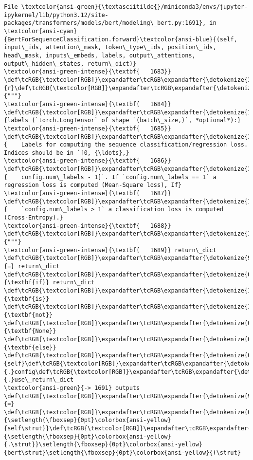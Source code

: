 \documentclass[11pt]{article}
\begin{document}
\begin{Verbatim}[commandchars=\\\{\}, frame=single, framerule=2mm, rulecolor=\color{outerrorbackground}]
File \textcolor{ansi-green}{\textasciitilde{}/miniconda3/envs/jupyter-ipykernel/lib/python3.12/site-packages/transformers/models/bert/modeling\_bert.py:1691}, in \textcolor{ansi-cyan}{BertForSequenceClassification.forward}\textcolor{ansi-blue}{(self, input\_ids, attention\_mask, token\_type\_ids, position\_ids, head\_mask, inputs\_embeds, labels, output\_attentions, output\_hidden\_states, return\_dict)}
\textcolor{ansi-green-intense}{\textbf{   1683}} \def\tcRGB{\textcolor[RGB]}\expandafter\tcRGB\expandafter{\detokenize{175,0,0}}{r}\def\tcRGB{\textcolor[RGB]}\expandafter\tcRGB\expandafter{\detokenize{175,0,0}}{"""}
\textcolor{ansi-green-intense}{\textbf{   1684}} \def\tcRGB{\textcolor[RGB]}\expandafter\tcRGB\expandafter{\detokenize{175,0,0}}{labels (`torch.LongTensor` of shape `(batch\_size,)`, *optional*):}
\textcolor{ansi-green-intense}{\textbf{   1685}} \def\tcRGB{\textcolor[RGB]}\expandafter\tcRGB\expandafter{\detokenize{175,0,0}}{    Labels for computing the sequence classification/regression loss. Indices should be in `[0, {\ldots},}
\textcolor{ansi-green-intense}{\textbf{   1686}} \def\tcRGB{\textcolor[RGB]}\expandafter\tcRGB\expandafter{\detokenize{175,0,0}}{    config.num\_labels - 1]`. If `config.num\_labels == 1` a regression loss is computed (Mean-Square loss), If}
\textcolor{ansi-green-intense}{\textbf{   1687}} \def\tcRGB{\textcolor[RGB]}\expandafter\tcRGB\expandafter{\detokenize{175,0,0}}{    `config.num\_labels > 1` a classification loss is computed (Cross-Entropy).}
\textcolor{ansi-green-intense}{\textbf{   1688}} \def\tcRGB{\textcolor[RGB]}\expandafter\tcRGB\expandafter{\detokenize{175,0,0}}{"""}
\textcolor{ansi-green-intense}{\textbf{   1689}} return\_dict \def\tcRGB{\textcolor[RGB]}\expandafter\tcRGB\expandafter{\detokenize{98,98,98}}{=} return\_dict \def\tcRGB{\textcolor[RGB]}\expandafter\tcRGB\expandafter{\detokenize{0,135,0}}{\textbf{if}} return\_dict \def\tcRGB{\textcolor[RGB]}\expandafter\tcRGB\expandafter{\detokenize{175,0,255}}{\textbf{is}} \def\tcRGB{\textcolor[RGB]}\expandafter\tcRGB\expandafter{\detokenize{175,0,255}}{\textbf{not}} \def\tcRGB{\textcolor[RGB]}\expandafter\tcRGB\expandafter{\detokenize{0,135,0}}{\textbf{None}} \def\tcRGB{\textcolor[RGB]}\expandafter\tcRGB\expandafter{\detokenize{0,135,0}}{\textbf{else}} \def\tcRGB{\textcolor[RGB]}\expandafter\tcRGB\expandafter{\detokenize{0,135,0}}{self}\def\tcRGB{\textcolor[RGB]}\expandafter\tcRGB\expandafter{\detokenize{98,98,98}}{.}config\def\tcRGB{\textcolor[RGB]}\expandafter\tcRGB\expandafter{\detokenize{98,98,98}}{.}use\_return\_dict
\textcolor{ansi-green}{-> 1691} outputs \def\tcRGB{\textcolor[RGB]}\expandafter\tcRGB\expandafter{\detokenize{98,98,98}}{=} \def\tcRGB{\textcolor[RGB]}\expandafter\tcRGB\expandafter{\detokenize{0,135,0}}{\setlength{\fboxsep}{0pt}\colorbox{ansi-yellow}{self\strut}}\def\tcRGB{\textcolor[RGB]}\expandafter\tcRGB\expandafter{\detokenize{98,98,98}}{\setlength{\fboxsep}{0pt}\colorbox{ansi-yellow}{.\strut}}\setlength{\fboxsep}{0pt}\colorbox{ansi-yellow}{bert\strut}\setlength{\fboxsep}{0pt}\colorbox{ansi-yellow}{(\strut}

\end{Verbatim}
\end{document}
